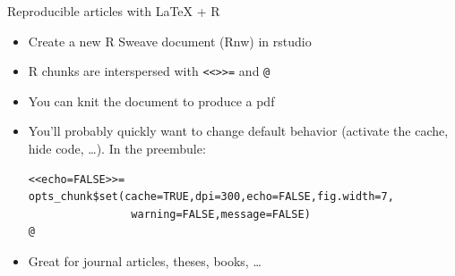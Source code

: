 \documentclass[xcolor=x11names,compress,8pt]{beamer}
\renewcommand{\(}{\begin{columns}}
\renewcommand{\)}{\end{columns}}
\newcommand{\<}[1]{\begin{column}{#1}}
\renewcommand{\>}{\end{column}}
\begin{document}
\begin{frame}[fragile,label=sec-4-2-3]{Reproducible articles with \LaTeX{} + R}
 \begin{itemize}
\item Create a new \alert{R Sweave} document (Rnw) in rstudio
\item R chunks are interspersed with 
\texttt{<\null<>\null>=}
and \texttt{@}
\item You can \alert{knit} the document to produce a pdf
\item You'll probably quickly want to \alert{change default behavior} (activate
the cache, hide code, \ldots{}). In the preembule:
\begin{verbatim}
<<echo=FALSE>>=
opts_chunk$set(cache=TRUE,dpi=300,echo=FALSE,fig.width=7,
                warning=FALSE,message=FALSE)
@
\end{verbatim}
\item Great for journal articles, theses, books, \ldots{}
\end{itemize}
\end{frame}


\end{document}
